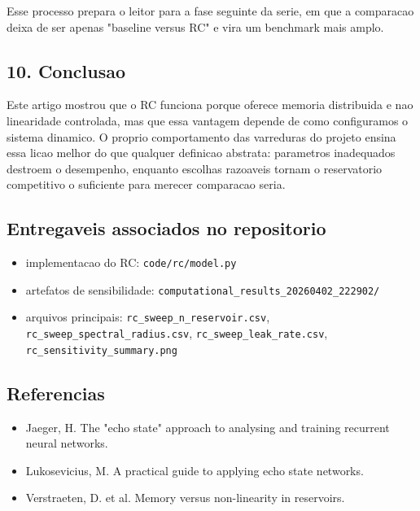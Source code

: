 \documentclass[12pt]{article}
\providecommand{\tightlist}{%
          \setlength{\itemsep}{0pt}\setlength{\parskip}{0pt}}
\begin{document}
Esse processo prepara o leitor para a fase seguinte da serie, em que a comparacao deixa de ser apenas "baseline versus RC" e vira um benchmark mais amplo.

\subsection{10. Conclusao}\label{10-conclusao}

Este artigo mostrou que o RC funciona porque oferece memoria distribuida e nao linearidade controlada, mas que essa vantagem depende de como configuramos o sistema dinamico. O proprio comportamento das varreduras do projeto ensina essa licao melhor do que qualquer definicao abstrata: parametros inadequados destroem o desempenho, enquanto escolhas razoaveis tornam o reservatorio competitivo o suficiente para merecer comparacao seria.

\subsection{Entregaveis associados no repositorio}\label{entregaveis-associados-no-repositorio}

\begin{itemize}
\tightlist
\item
  implementacao do RC: \texttt{code/rc/model.py}
\item
  artefatos de sensibilidade: \texttt{computational\_results\_20260402\_222902/}
\item
  arquivos principais: \texttt{rc\_sweep\_n\_reservoir.csv}, \texttt{rc\_sweep\_spectral\_radius.csv}, \texttt{rc\_sweep\_leak\_rate.csv}, \texttt{rc\_sensitivity\_summary.png}
\end{itemize}

\subsection{Referencias}\label{referencias}

\begin{itemize}
\tightlist
\item
  Jaeger, H. The "echo state" approach to analysing and training recurrent neural networks.
\item
  Lukosevicius, M. A practical guide to applying echo state networks.
\item
  Verstraeten, D. et al. Memory versus non-linearity in reservoirs.
\end{itemize}

        
\end{document}
